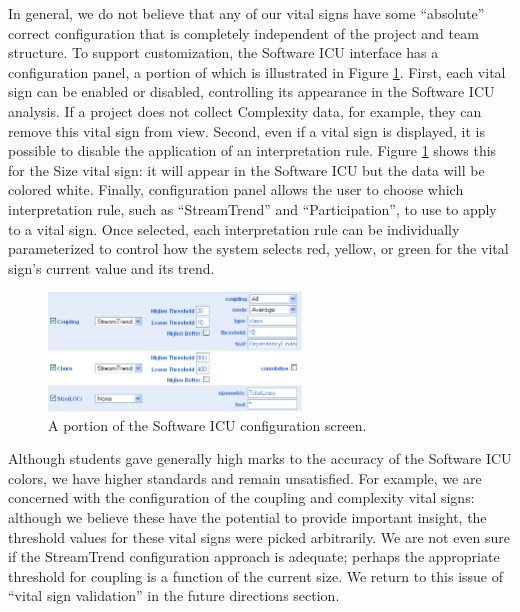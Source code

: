 \documentclass[10pt,twocolumn]{article}
\begin{document}
In general, we do not believe that any of our vital signs have some
``absolute'' correct configuration that is completely independent of the project and
team structure.  To support customization, the Software ICU interface has a
configuration panel, a portion of which is illustrated in Figure
\ref{fig:configuration}.  First, each vital sign can be enabled or
disabled, controlling its appearance in the Software ICU analysis. If a
project does not collect Complexity data, for example, they can remove this
vital sign from view.  Second, even if a vital sign is displayed, it is
possible to disable the application of an interpretation rule.  Figure
\ref{fig:configuration} shows this for the Size vital sign: it will appear
in the Software ICU but the data will be colored white.  Finally,
configuration panel allows the user to choose which interpretation rule,
such as ``StreamTrend'' and ``Participation'', to use to apply to a vital
sign. Once selected, each interpretation rule can be individually
parameterized to control how the system selects red, yellow, or green for
the vital sign's current value and its trend.

\begin{figure}[ht]
  \center
  \includegraphics[width=0.6\textwidth]{configuration.eps}
  \caption{A portion of the Software ICU configuration screen.}
  \label{fig:configuration}
\end{figure} 

Although students gave generally high marks to the accuracy of the Software
ICU colors, we have higher standards and remain unsatisfied.  For example,
we are concerned with the configuration of the coupling and complexity
vital signs: although we believe these have the potential to provide
important insight, the threshold values for these vital signs were picked
arbitrarily.  We are not even sure if the StreamTrend configuration
approach is adequate; perhaps the appropriate threshold for coupling is a
function of the current size. We return to this issue of ``vital sign validation'' in the
future directions section.

\end{document}
